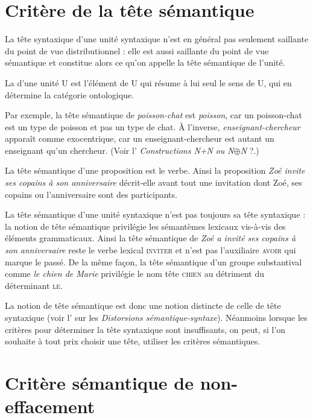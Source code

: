 \section{Critère de la tête sémantique}\label{sec:3.3.17}

La tête syntaxique d’une unité syntaxique n’est en général pas seulement saillante du point de vue distributionnel : elle est aussi saillante du point de vue sémantique et constitue alors ce qu’on appelle la tête sémantique de l’unité.

{La  d’une unité U est l’élément de U qui résume à lui seul le sens de U, qui en détermine la catégorie ontologique.}

Par exemple, la tête sémantique de \textit{poisson-chat} est \textit{poisson}, car un poisson-chat est un type de poisson et pas un type de chat. À l’inverse, \textit{enseignant-chercheur} apparaît comme exocentrique, car un enseignant-chercheur est autant un enseignant qu’un chercheur. (Voir l’ \textit{Constructions N+N} \textit{ou N}${\oplus}$\textit{N} ?.)

La tête sémantique d’une proposition est le verbe. Ainsi la proposition \textit{Zoé invite ses copains à son anniversaire} décrit-elle avant tout une invitation dont Zoé, ses copains ou l’anniversaire sont des participants.

La tête sémantique d’une unité syntaxique n’est pas toujours sa tête syntaxique : la notion de tête sémantique privilégie les sémantèmes lexicaux vis-à-vis des éléments grammaticaux. Ainsi la tête sémantique de \textit{Zoé a invité ses copains à son anniversaire} reste le verbe lexical \textsc{inviter} et n’est pas l’auxiliaire \textsc{avoir} qui marque le passé. De la même façon, la tête sémantique d’un groupe substantival comme \textit{le chien de Marie} privilégie le nom tête \textsc{chien} au détriment du déterminant \textsc{le}.

La notion de tête sémantique est donc une notion distincte de celle de tête syntaxique (voir l’ sur les \textit{Distorsions sémantique-syntaxe}). Néanmoins lorsque les critères pour déterminer la tête syntaxique sont insuffisants, on peut, si l’on souhaite à tout prix choisir une tête, utiliser les critères sémantiques.

\section{Critère sémantique de non-effacement}\label{sec:3.3.18}

